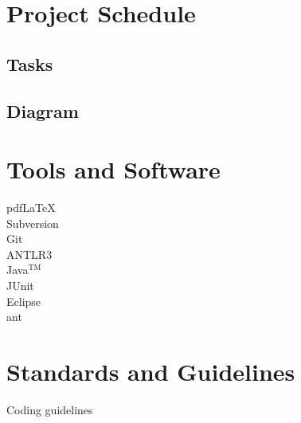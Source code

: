 \chapter{Project Schedule}
\section{Tasks}

\begin{landscape}
\section{Diagram}
  \begin{gantt}[xunitlength=0.9cm]{12}{16}
    \begin{ganttitle}
    \end{ganttitle}
  \end{gantt}
\end{landscape}

\chapter{Tools and Software}
\begin{description}
  \item[pdf\LaTeX] 
  \item[Subversion]
  \item[Git]
  \item[ANTLR3]
  \item[Java$^{\textrm{TM}}$]
  \item[JUnit]
  \item[Eclipse]
  \item[ant]
\end{description}

\chapter{Standards and Guidelines}
Coding guidelines

